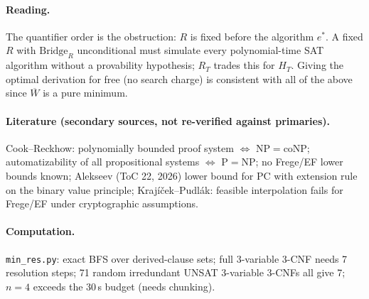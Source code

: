 \documentclass{article}\usepackage{amsmath,amssymb,amsthm}
\begin{document}
\paragraph{Reading.} The quantifier order is the obstruction: $R$ is fixed before the algorithm $e^*$. A fixed $R$ with $\mathrm{Bridge}_R$ unconditional must simulate every polynomial-time SAT algorithm without a provability hypothesis; $R_T$ trades this for $H_T$. Giving the optimal derivation for free (no search charge) is consistent with all of the above since $\overline W$ is a pure minimum.

\paragraph{Literature (secondary sources, not re-verified against primaries).} Cook--Reckhow: polynomially bounded proof system $\iff$ NP$=$coNP; automatizability of all propositional systems $\iff$ P$=$NP; no Frege/EF lower bounds known; Alekseev (ToC 22, 2026) lower bound for PC with extension rule on the binary value principle; Krajíček--Pudlák: feasible interpolation fails for Frege/EF under cryptographic assumptions.

\paragraph{Computation.} \texttt{min\_res.py}: exact BFS over derived-clause sets; full 3-variable 3-CNF needs 7 resolution steps; 71 random irredundant UNSAT 3-variable 3-CNFs all give 7; $n=4$ exceeds the 30\,s budget (needs chunking).
\end{document}
